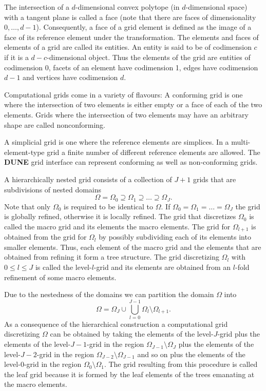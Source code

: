 \documentclass[11pt,a4paper,headinclude,footinclude,DIV16,headings=normal]{scrreprt}
\newcommand{\Dune}{{\sffamily\bfseries DUNE}\xspace}
\begin{document}

The intersection of a $d$-dimensional convex polytope (in
$d$-dimensional space) with a
tangent plane is called a face (note that there are faces of
dimensionality $0,\ldots,d-1$). Consequently, a face of a grid element
is defined as the image of a face of its reference element under the
transformation. The elements and faces of elements of a grid are
called its entities. An entity is said to be of codimension $c$ if it
is a $d-c$-dimensional object. Thus the elements of the grid are
entities of codimension 0, facets of an element have codimension 1,
edges have codimension $d-1$ and vertices have codimension $d$.


Computational grids come in a variety of flavours: A
{conforming} grid is one where the intersection of two
elements is either empty or a face of each of the two elements.
Grids where the intersection of two elements may have an
arbitrary shape are called {nonconforming}.


A {simplicial} grid is one where the reference elements are
simplices. In a {multi-element-type} grid a finite number of
different reference elements are allowed. The \Dune{} grid interface
can represent conforming as well as non-conforming grids.


A {hierarchically nested} grid consists of a collection of $J+1$
grids that are subdivisions of nested domains $$\Omega=\Omega_0 \supseteq \Omega_1 \supseteq
\ldots \supseteq \Omega_J.$$ Note that only $\Omega_0$ is required to
be identical to $\Omega$. If $\Omega_0=\Omega_1=\ldots=\Omega_J$ the
grid is {globally refined}, otherwise it is {locally refined}.
The grid that discretizes $\Omega_0$ is called the macro grid and its
elements the macro elements. The
grid for $\Omega_{l+1}$ is obtained from the grid
for $\Omega_l$ by possibly subdividing each of its elements into
smaller elements. Thus, each element of the macro grid and the
elements that are obtained from refining it form a tree structure. The
grid discretizing $\Omega_l$ with $0\leq l \leq J$ is called the level-$l$-grid and its
elements are obtained from an $l$-fold refinement of some macro elements.


Due to the nestedness of the domains we can partition the domain
$\Omega$ into $$\Omega = \Omega_J \cup \bigcup_{l=0}^{J-1}
\Omega_l\setminus\Omega_{l+1}.$$ As a consequence of the hierarchical
construction a computational grid discretizing $\Omega$ can be
obtained by taking the elements of the level-$J$-grid plus
the elements of the level-$J-1$-grid in the region
$\Omega_{J-1}\setminus\Omega_{J}$ plus the elements of the level-$J-2$-grid in the region
$\Omega_{J-2}\setminus\Omega_{J-1}$ and so on plus the elements of the level-$0$-grid in the region
$\Omega_{0}\setminus\Omega_{1}$. The grid resulting from this
procedure is called the leaf grid
because it is formed by the leaf elements of the trees emanating at
the macro elements.
\end{document}
